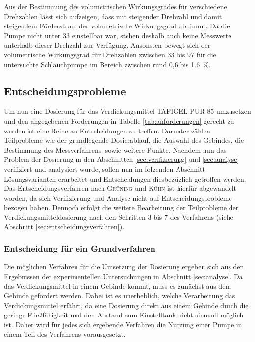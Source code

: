 Aus der Bestimmung des volumetrischen Wirkungsgrades für verschiedene Drehzahlen lässt sich aufzeigen, dass mit steigender Drehzahl und damit steigendem Förderstrom der volumetrische Wirkungsgrad abnimmt. Da die Pumpe nicht unter \SI{33}{\rpm} einstellbar war, stehen deshalb auch keine Messwerte unterhalb dieser Drehzahl zur Verfügung. Ansonsten bewegt sich der volumetrische Wirkungsgrad für Drehzahlen zwischen 33 bis \SI{97}{\rpm} für die untersuchte Schlauchpumpe im Bereich zwischen rund 0,6 bis \SI{1.6}{\percent}.

\subsection{Entscheidungsprobleme}
\label{subsec:entscheidungsprobleme}

Um nun eine Dosierung für das Verdickungsmittel TAFIGEL PUR 85 umzusetzen und den angegebenen Forderungen in Tabelle \ref{tab:anforderungen} gerecht zu werden ist eine Reihe an Entscheidungen zu treffen. Darunter zählen Teilprobleme wie der grundlegende Dosierablauf, die Auswahl des Gebindes, die Bestimmung des Messverfahrens, sowie weitere Punkte. Nachdem nun das Problem der Dosierung in den Abschnitten \ref{sec:verifizierung} und \ref{sec:analyse} verifiziert und analysiert wurde, sollen nun im folgenden Abschnitt Lösungsvarianten erarbeitet und Entscheidungen diesbezüglich getroffen werden. Das Entscheidungsverfahren nach \textsc{Grüning} und \textsc{Kühn} ist hierfür abgewandelt worden, da sich Verifizierung und Analyse nicht auf Entscheidungsprobleme bezogen haben. Dennoch erfolgt die weitere Bearbeitung der Teilprobleme der Verdickungsmitteldosierung nach den Schritten 3 bis 7 des Verfahrens (siehe Abschnitt \ref{sec:entscheidungsverfahren}). 

\subsubsection{Entscheidung für ein Grundverfahren}
Die möglichen Verfahren für die Umsetzung der Dosierung ergeben sich aus den Ergebnissen der experimentellen Untersuchungen in Abschnitt \ref{sec:analyse}. Da das Verdickungsmittel in einem Gebinde kommt, muss es zunächst aus dem Gebinde gefördert werden. Dabei ist es unerheblich, welche Verarbeitung das Verdickungsmittel erfährt, da eine Dosierung direkt aus einem Gebinde durch die geringe Fließfähigkeit und den Abstand zum Einstelltank nicht sinnvoll möglich ist. Daher wird für jedes sich ergebende Verfahren die Nutzung einer Pumpe in einem Teil des Verfahrens vorausgesetzt.

